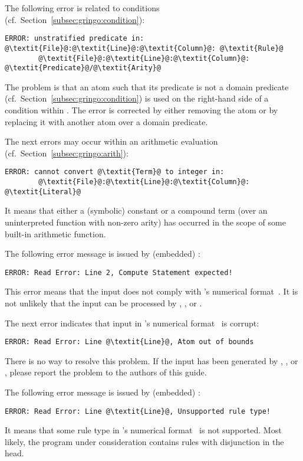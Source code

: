 The following error is related to conditions
(cf.\ Section~\ref{subsec:gringo:condition}):
%
\begin{lstlisting}[numbers=none,escapechar=@]
ERROR: unstratified predicate in:
@\textit{File}@:@\textit{Line}@:@\textit{Column}@: @\textit{Rule}@
        @\textit{File}@:@\textit{Line}@:@\textit{Column}@: @\textit{Predicate}@/@\textit{Arity}@
\end{lstlisting}
%
The problem is that an atom  such
that its predicate  is not a domain predicate
(cf.\ Section~\ref{subsec:gringo:condition}) is used on the right-hand side of a condition
within .
The error is corrected by either removing the atom or
by replacing it with another atom over a domain predicate.

The next errors may occur within an arithmetic evaluation
(cf.\ Section~\ref{subsec:gringo:arith}):
%
\begin{lstlisting}[numbers=none,escapechar=@]
ERROR: cannot convert @\textit{Term}@ to integer in:
        @\textit{File}@:@\textit{Line}@:@\textit{Column}@: @\textit{Literal}@
\end{lstlisting}
%
It means that either a (symbolic) constant or a compound term
(over an uninterpreted function with non-zero arity)
has occurred in the scope of some built-in arithmetic function.

The following error message is issued by (embedded) \clasp:
%
\begin{lstlisting}[numbers=none,escapechar=@]
ERROR: Read Error: Line 2, Compute Statement expected!
\end{lstlisting}
%
This error means that the input does not comply with \lparse's
numerical format~\cite{lparseManual}.
It is not unlikely that the input can be processed
by \gringo, \clingo, or \iclingo.

The next error indicates that input in
\lparse's numerical format~\cite{lparseManual} is corrupt:
%
\begin{lstlisting}[numbers=none,escapechar=@]
ERROR: Read Error: Line @\textit{Line}@, Atom out of bounds
\end{lstlisting}
%
There is no way to resolve this problem.
If the input has been generated by \gringo, \clingo, or \iclingo,
please report the problem to the authors of this guide.

The following error message is issued by (embedded) \clasp:
%
\begin{lstlisting}[numbers=none,escapechar=@]
ERROR: Read Error: Line @\textit{Line}@, Unsupported rule type!
\end{lstlisting}
%
It means that some rule type in \lparse's
numerical format~\cite{lparseManual} is not supported.
Most likely, the program under consideration contains
rules with disjunction in the head.

